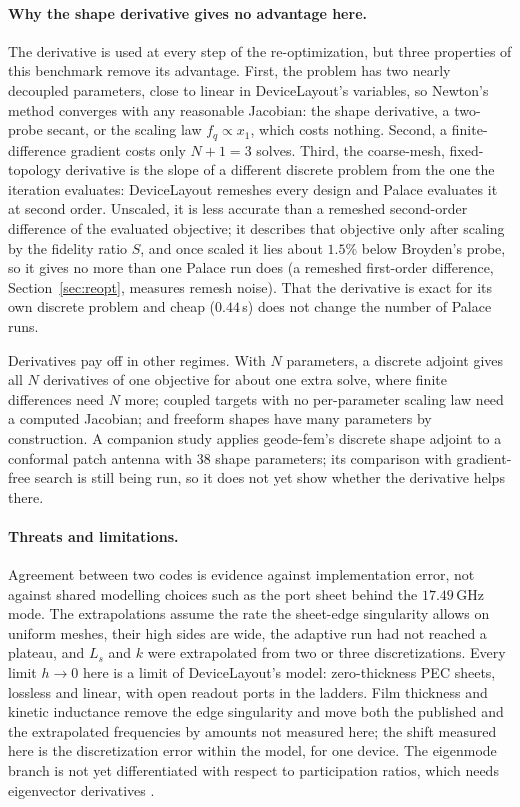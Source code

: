 \documentclass{anvil-paper}
\begin{document}
\paragraph{Why the shape derivative gives no advantage here.}
The derivative is used at every step of the re-optimization, but three
properties of this benchmark remove its advantage. First, the problem has
two nearly decoupled parameters, close to linear in DeviceLayout's
variables, so Newton's method converges with any reasonable Jacobian: the
shape derivative, a two-probe secant, or the scaling law $f_q \propto x_1$,
which costs nothing. Second, a finite-difference gradient costs only $N+1 =
3$ solves. Third, the coarse-mesh, fixed-topology derivative is the slope
of a different discrete problem from the one the iteration evaluates:
DeviceLayout remeshes every design and Palace evaluates it at second
order. Unscaled, it is less accurate than a remeshed second-order
difference of the evaluated objective; it describes that objective only
after scaling by the fidelity ratio $S$, and once scaled it lies about
$1.5\%$ below Broyden's probe, so it gives no more than one Palace run
does (a remeshed first-order difference, Section~\ref{sec:reopt}, measures
remesh noise). That the
derivative is exact for its own discrete problem and cheap ($0.44$\,s)
does not change the number of Palace runs.

Derivatives pay off in other regimes. With $N$ parameters, a discrete
adjoint gives all $N$ derivatives of one objective for about one extra
solve, where finite differences need $N$ more; coupled targets with no
per-parameter scaling law need a computed Jacobian; and freeform shapes
have many parameters by construction. A companion study
\citep{walters2026conformal} applies geode-fem's discrete shape adjoint to
a conformal patch antenna with 38 shape parameters; its comparison with
gradient-free search is still being run, so it does not yet show whether
the derivative helps there.

\paragraph{Threats and limitations.}
Agreement between two codes is evidence against implementation error, not
against shared modelling choices such as the port sheet behind the
$17.49$\,GHz mode. The extrapolations assume the rate the sheet-edge
singularity allows on uniform meshes, their high sides are wide, the
adaptive run had not reached a plateau, and $L_s$ and $k$ were extrapolated
from two or three discretizations. Every limit $h \to 0$ here is a limit of
DeviceLayout's model: zero-thickness PEC sheets, lossless and linear, with
open readout ports in the ladders. Film thickness and kinetic inductance
remove the edge singularity and move both the published and the
extrapolated frequencies by amounts not measured here; the shift measured
here is the discretization error within the model, for one device. The eigenmode branch is not yet
differentiated with respect to participation ratios, which needs
eigenvector derivatives \citep{nelson1976simplified}.
\end{document}
